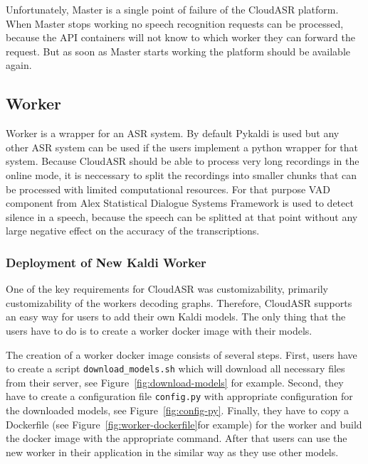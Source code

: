 Unfortunately, Master is a single point of failure of the CloudASR platform.
When Master stops working no speech recognition requests can be processed,
  because the API containers will not know to which worker they can forward the request.
But as soon as Master starts working the platform should be available again.


\subsection{Worker}
Worker is a wrapper for an ASR system.
By default Pykaldi is used but any other ASR system can be used
  if the users implement a python wrapper for that system.
Because CloudASR should be able to process very long recordings in the online mode,
  it is neccessary to split the recordings into smaller chunks
  that can be processed with limited computational resources.
For that purpose VAD component from Alex Statistical Dialogue Systems Framework \cite{jurcicek2014alex} is used to detect silence in a speech,
  because the speech can be splitted at that point without any large negative effect on the accuracy of the transcriptions.



\subsubsection{Deployment of New Kaldi Worker}
One of the key requirements for CloudASR was customizability,
  primarily customizability of the workers decoding graphs.
Therefore, CloudASR supports an easy way for users to add their own Kaldi models.
The only thing that the users have to do is to create a worker docker image with their models.

The creation of a worker docker image consists of several steps.
First, users have to create a script \texttt{download\_models.sh} which will download all necessary files from their server,
  see Figure~\ref{fig:download-models} for example.
Second, they have to create a configuration file \texttt{config.py} with appropriate configuration for the downloaded models,
  see Figure~\ref{fig:config-py}.
Finally, they have to copy a Dockerfile (see Figure~\ref{fig:worker-dockerfile}for example) for the worker
  and build the docker image with the appropriate command.
After that users can use the new worker in their application in the similar way as they use other models.

